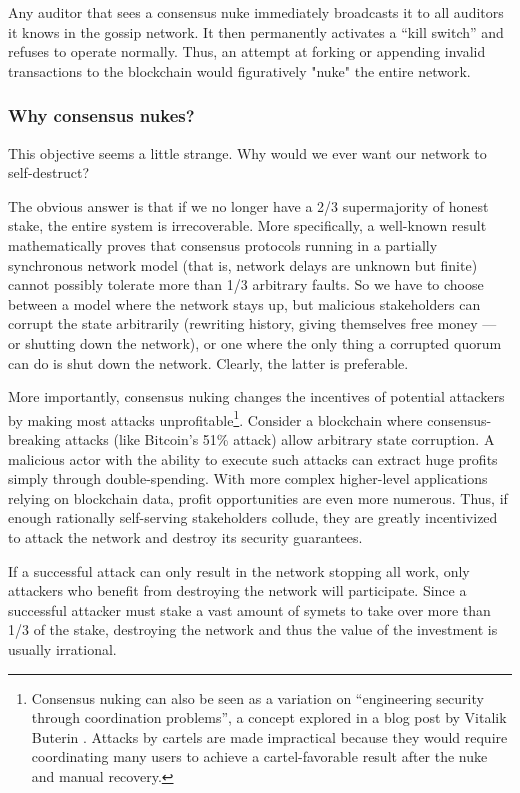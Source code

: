 \documentclass[headinclude,12pt]{scrbook}
\begin{document}
Any auditor that sees a consensus nuke immediately broadcasts it to all auditors it knows in the gossip network. It then permanently activates a ``kill switch'' and refuses to operate normally. Thus, an attempt at forking or appending invalid transactions to the blockchain would figuratively "nuke" the entire network.

\subsubsection{Why consensus nukes?}

This objective seems a little strange. Why would we ever want our network to self-destruct?

The obvious answer is that if we no longer have a 2/3 supermajority of honest stake, the entire system is irrecoverable. More specifically, a well-known result \cite{dwork1988consensus} mathematically proves that consensus protocols running in a partially synchronous network model (that is, network delays are unknown but finite) cannot possibly tolerate more than 1/3 arbitrary faults. So we have to choose between a model where the network stays up, but malicious stakeholders can corrupt the state arbitrarily (rewriting history, giving themselves free money --- or shutting down the network), or one where the only thing a corrupted quorum can do is shut down the network. Clearly, the latter is preferable.

More importantly, consensus nuking changes the incentives of potential attackers by making most attacks unprofitable\footnote{Consensus nuking can also be seen as a variation on ``engineering security through coordination problems'', a concept explored in a blog post by Vitalik Buterin \cite{buterin2017coordination}. Attacks by cartels are made impractical because they would require coordinating many users to achieve a cartel-favorable result after the nuke and manual recovery.}. Consider a blockchain where consensus-breaking attacks (like Bitcoin's 51\% attack) allow arbitrary state corruption. A malicious actor with the ability to execute such attacks can extract huge profits simply through double-spending. With more complex higher-level applications relying on blockchain data, profit opportunities are even more numerous. Thus, if enough rationally self-serving stakeholders collude, they are greatly incentivized to attack the network and destroy its security guarantees.

If a successful attack can only result in the network stopping all work, only attackers who benefit from destroying the network will participate. Since a successful attacker must stake a vast amount of symets to take over more than 1/3 of the stake, destroying the network and thus the value of the investment is usually irrational.
\end{document}
